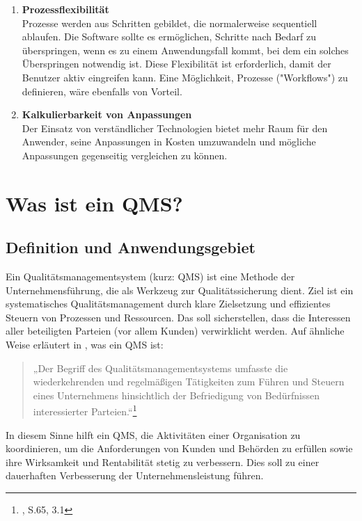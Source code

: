 \documentclass[11pt]{scrartcl}       %
\begin{document}
\begin{enumerate}
\item[] \textbf{Prozessflexibilität} \\
Prozesse werden aus Schritten gebildet, die normalerweise sequentiell ablaufen. Die Software sollte es ermöglichen, Schritte nach Bedarf zu überspringen, wenn es zu einem Anwendungsfall kommt, bei dem ein solches Überspringen notwendig ist. Diese Flexibilität ist erforderlich, damit der Benutzer aktiv eingreifen kann. Eine Möglichkeit, Prozesse ("Workflows") zu definieren, wäre ebenfalls von Vorteil.

\item[] \textbf{Kalkulierbarkeit von Anpassungen} \\
Der Einsatz von verständlicher Technologien bietet mehr Raum für den Anwender, seine Anpassungen in Kosten umzuwandeln und mögliche Anpassungen gegenseitig vergleichen zu können.


\end{enumerate}


\section{Was ist ein QMS?}
\subsection{Definition und Anwendungsgebiet}
Ein Qualitätsmanagementsystem (kurz: QMS) ist eine Methode der Unternehmensführung, die als Werkzeug zur Qualitätssicherung dient. Ziel ist ein systematisches Qualitätsmanagement durch klare Zielsetzung und effizientes Steuern von Prozessen und Ressourcen. Das soll sicherstellen, dass die Interessen aller beteiligten Parteien (vor allem Kunden) verwirklicht werden. Auf ähnliche Weise erläutert \citeauthor{mai2020grundlage} in \citeyear{mai2020grundlage}, was ein QMS ist:
\begin{quotation}
„Der Begriff des Qualitätsmanagementsystems umfasste die wiederkehrenden und regelmäßigen Tätigkeiten zum Führen und Steuern eines Unternehmens hinsichtlich der Befriedigung von Bedürfnissen interessierter Parteien.“\footnote{\cite{mai2020grundlage}, S.65, 3.1}
\end{quotation}
In diesem Sinne hilft ein QMS, die Aktivitäten einer Organisation zu koordinieren, um die Anforderungen von Kunden und Behörden zu erfüllen sowie ihre Wirksamkeit und Rentabilität stetig zu verbessern. Dies soll zu einer dauerhaften Verbesserung der Unternehmensleistung führen.
\\
\end{document}
